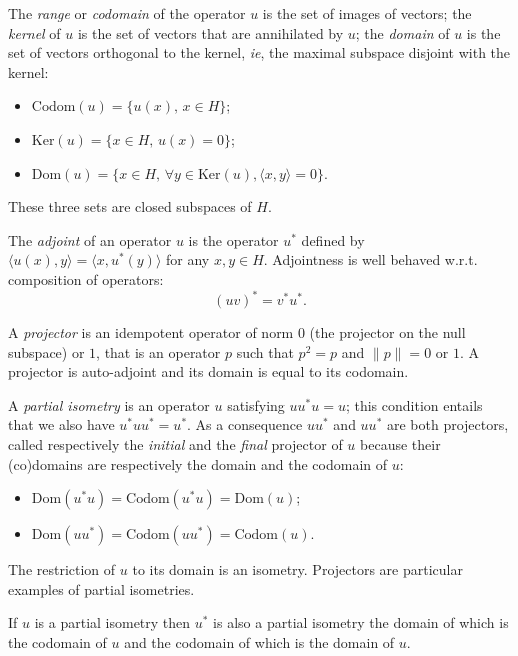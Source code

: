 The \emph{range} or \emph{codomain} of the operator \(u\) is the set of
images of vectors; the \emph{kernel} of \(u\) is the set of vectors that
are annihilated by \(u\); the \emph{domain} of \(u\) is the set of
vectors orthogonal to the kernel, \emph{ie}, the maximal subspace
disjoint with the kernel:
\begin{itemize}
\item \(\mathrm{Codom}(u) = \{u(x),\, x\in H\}\);
\item \(\mathrm{Ker}(u) = \{x\in H,\, u(x) = 0\}\);
\item \(\mathrm{Dom}(u) = \{x\in H,\, \forall y\in\mathrm{Ker}(u), \langle x, y\rangle = 0\}\).
\end{itemize}

These three sets are closed subspaces of \(H\).

The \emph{adjoint} of an operator \(u\) is the operator \(u^*\) defined
by \(\langle u(x), y\rangle = \langle x, u^*(y)\rangle\) for any
\(x,y\in H\). Adjointness is well behaved w.r.t. composition of
operators:
\begin{equation*}
(uv)^* = v^*u^*.
\end{equation*}

A \emph{projector} is an idempotent operator of norm \(0\) (the
projector on the null subspace) or \(1\), that is an operator \(p\) such
that \(p^2 = p\) and \(\|p\| = 0\) or \(1\). A projector is auto-adjoint
and its domain is equal to its codomain.

A \emph{partial isometry} is an operator \(u\) satisfying \(uu^* u =
u\); this condition entails that we also have \(u^*uu^* =
u^*\). As a consequence \(uu^*\) and \(uu^*\) are both projectors,
called respectively the \emph{initial} and the \emph{final} projector of
\(u\) because their (co)domains are respectively the domain and the
codomain of \(u\):
\begin{itemize}
\item \(\mathrm{Dom}(u^*u) = \mathrm{Codom}(u^*u) = \mathrm{Dom}(u)\);
\item \(\mathrm{Dom}(uu^*) = \mathrm{Codom}(uu^*) = \mathrm{Codom}(u)\).
\end{itemize}

The restriction of \(u\) to its domain is an isometry. Projectors are
particular examples of partial isometries.

If \(u\) is a partial isometry then \(u^*\) is also a partial isometry
the domain of which is the codomain of \(u\) and the codomain of which
is the domain of \(u\).

